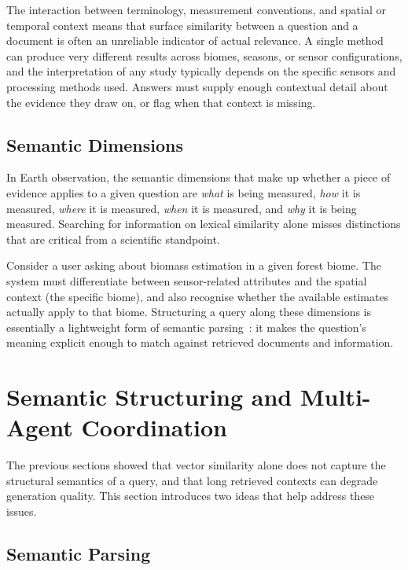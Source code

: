 The interaction between terminology, measurement conventions, and spatial or temporal context means that surface similarity between a question and a document is often an unreliable indicator of actual relevance. A single method can produce very different results across biomes, seasons, or sensor configurations, and the interpretation of any study typically depends on the specific sensors and processing methods used. Answers must supply enough contextual detail about the evidence they draw on, or flag when that context is missing.

\subsection{Semantic Dimensions}
\label{subsec:eo-dimensions}

In Earth observation, the semantic dimensions that make up whether a piece of evidence applies to a given question are \emph{what} is being measured, \emph{how} it is measured, \emph{where} it is measured, \emph{when} it is measured, and \emph{why} it is being measured. Searching for information on lexical similarity alone misses distinctions that are critical from a scientific standpoint.

Consider a user asking about biomass estimation in a given forest biome. The system must differentiate between sensor-related attributes and the spatial context (the specific biome), and also recognise whether the available estimates actually apply to that biome. Structuring a query along these dimensions is essentially a lightweight form of semantic parsing~\citep{berant2013semantic}: it makes the question's meaning explicit enough to match against retrieved documents and information.

\section{Semantic Structuring and Multi-Agent Coordination}
\label{sec:background-agents}

The previous sections showed that vector similarity alone does not capture the structural semantics of a query, and that long retrieved contexts can degrade generation quality. This section introduces two ideas that help address these issues.

\subsection{Semantic Parsing}

